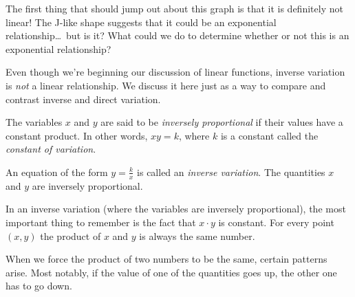 The first thing that should jump out about this graph is that it is definitely not linear! The J-like shape suggests that it could be an exponential relationship\ldots\ but is it? What could we do to determine whether or not this is an exponential relationship?

\begin{boxwarn}
Even though we're beginning our discussion of linear functions, inverse variation is \textit{not} a linear relationship. We discuss it here just as a way to compare and contrast inverse and direct variation.
\end{boxwarn}

\begin{boxdef}
The variables $x$ and $y$ are said to be \textit{inversely proportional} if their values have a constant product. In other words, $xy = k$, where $k$ is a constant called the \textit{constant of variation}.

An equation of the form $y = \frac{k}{x}$ is called an \textit{inverse variation}. The quantities $x$ and $y$ are inversely proportional.
\end{boxdef}

In an inverse variation (where the variables are inversely proportional), the most important thing to remember is the fact that $x \cdot y$ is constant. For every point $(x, y)$ the product of $x$ and $y$ is always the same number.

When we force the product of two numbers to be the same, certain patterns arise. Most notably, if the value of one of the quantities goes up, the other one has to go down.

%

